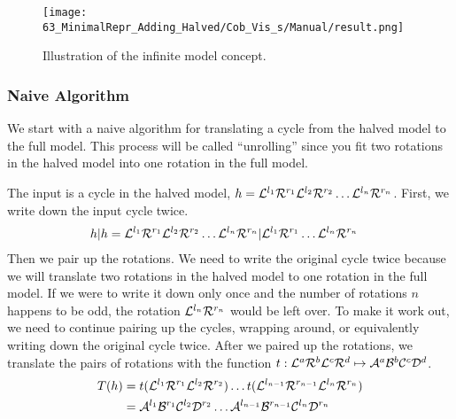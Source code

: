 \begin{figure}
	\centering
	\texttt{[image: 63\_MinimalRepr\_Adding\_Halved/Cob\_Vis\_s/Manual/result.png]}
	\caption{Illustration of the infinite model concept.}
	\label{fig:minrep.infinite.model.concept}
\end{figure}

\subsubsection{Naive Algorithm}


We start with a naive algorithm for translating a cycle from the halved model to the full model.
This process will be called ``unrolling'' since you fit two rotations in the halved model into one rotation in the full model.

The input is a cycle in the halved model, $h = \mathcal{L}^{l_1}\mathcal{R}^{r_1}\mathcal{L}^{l_2}\mathcal{R}^{r_2} \ldots \mathcal{L}^{l_n}\mathcal{R}^{r_n}$.
First, we write down the input cycle twice.
\begin{align}
	h|h & = \mathcal{L}^{l_1}\mathcal{R}^{r_1}\mathcal{L}^{l_2}\mathcal{R}^{r_2} \ldots \mathcal{L}^{l_n}\mathcal{R}^{r_n} | \mathcal{L}^{l_1}\mathcal{R}^{r_1} \ldots \mathcal{L}^{l_n}\mathcal{R}^{r_n}
\end{align}
Then we pair up the rotations.
We need to write the original cycle twice because we will translate two rotations in the halved model to one rotation in the full model.
If we were to write it down only once and the number of rotations $n$ happens to be odd, the rotation $\mathcal{L}^{l_n}\mathcal{R}^{r_n}$ would be left over.
To make it work out, we need to continue pairing up the cycles, wrapping around, or equivalently writing down the original cycle twice.
After we paired up the rotations, we translate the pairs of rotations with the function $t: \mathcal{L}^a\mathcal{R}^b\mathcal{L}^c\mathcal{R}^d \mapsto \mathcal{A}^a\mathcal{B}^b\mathcal{C}^c\mathcal{D}^d$.
\begin{subequations}
	\begin{align}
		T(h) & = t(\mathcal{L}^{l_1}\mathcal{R}^{r_1}\mathcal{L}^{l_2}\mathcal{R}^{r_2}) \dots t(\mathcal{L}^{l_{n-1}}\mathcal{R}^{r_{n-1}}\mathcal{L}^{l_n}\mathcal{R}^{r_n}) \\
		     & = \mathcal{A}^{l_1}\mathcal{B}^{r_1}\mathcal{C}^{l_2}\mathcal{D}^{r_2} \dots \mathcal{A}^{l_{n-1}}\mathcal{B}^{r_{n-1}}\mathcal{C}^{l_n}\mathcal{D}^{r_n}
	\end{align}
\end{subequations}

